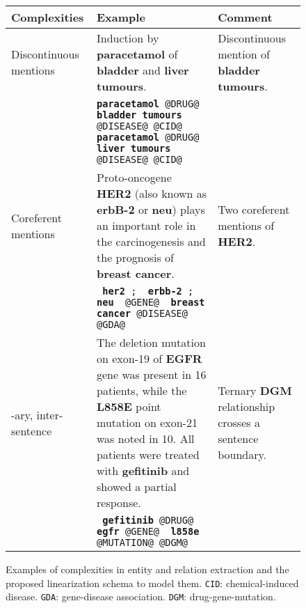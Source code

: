 \documentclass[11pt]{article}
\begin{document}
\begin{figure*}[t]
\centering
\caption{Examples of complexities in entity and relation extraction and the proposed linearization schema to model them. \texttt{CID}: chemical-induced disease. \texttt{GDA}: gene-disease association. \texttt{DGM}: drug-gene-mutation.}
\label{fig:complexities}
\small
\begin{tabular}{p{} p{} p{}}
\toprule
Complexities &
  Example &
  Comment \\ \midrule
Discontinuous mentions &
  Induction by {\color{MyGreen}\textbf{paracetamol}} of {\color{MyOrange}\textbf{bladder}} and {\color{MyOrange} \textbf{liver tumours}}. &
  Discontinuous mention of {\color{MyOrange}\textbf{bladder tumours}}. \\ \cmidrule(lr){2-2}
 &
  \texttt{{\color{MyGreen}\textbf{paracetamol} @DRUG@} {\color{MyOrange}\textbf{bladder tumours} @DISEASE@} @CID@ \newline {\color{MyGreen}\textbf{paracetamol} @DRUG@} {\color{MyOrange}\textbf{liver tumours} @DISEASE@} @CID@} &
   \\ \cmidrule(r){1-3}
Coreferent mentions &
  Proto-oncogene {\color{MyPurple} \textbf{HER2}} (also known as {\color{MyPurple} \textbf{erbB-2}} or {\color{MyPurple} \textbf{neu}}) plays an important role in the carcinogenesis and the prognosis of {\color{MyOrange} \textbf{breast cancer}}. &
  Two coreferent mentions of {\color{MyPurple} \textbf{HER2}}. \\ \cmidrule(lr){2-2}
 &
  \texttt{{\color{MyPurple} \textbf{her2}} ; {\color{MyPurple} \textbf{erbb-2}} ; {\color{MyPurple} \textbf{neu}} {\color{MyPurple} @GENE@} {\color{MyOrange} \textbf{breast cancer} @DISEASE@} @GDA@} &
   \\ \cmidrule(r){1-3}
-ary, inter-sentence &
  The deletion mutation on exon-19 of {\color{MyPurple} \textbf{EGFR}} gene was present in 16 patients, while the {\color{MyPurple} \textbf{L858E}} point mutation on exon-21 was noted in 10. All patients were treated with {\color{MyGreen}\textbf{gefitinib}} and showed a partial response. &
  Ternary {\color{MyGreen}\textbf{D}}{\color{MyPurple}\textbf{G}}{\color{MyBlue}\textbf{M}} relationship crosses a sentence boundary. \\ \cmidrule(lr){2-2}
 &
  \texttt{{\color{MyGreen} \textbf{gefitinib} @DRUG@} {\color{MyPurple} \textbf{egfr} @GENE@} {\color{MyBlue} \textbf{l858e} @MUTATION@} @DGM@} &
   \\ \bottomrule
\end{tabular}
\vspace{-3mm}
\end{figure*}
\end{document}
